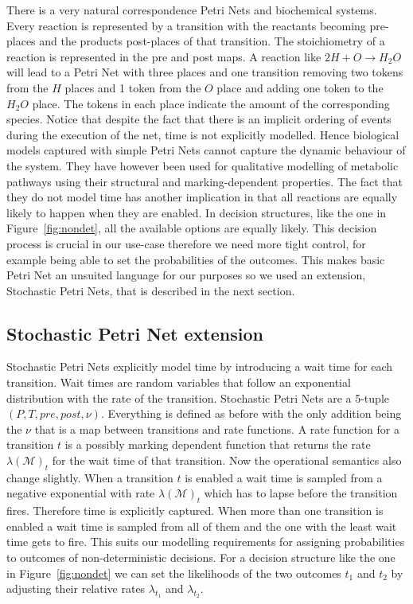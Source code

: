 There is a very natural correspondence Petri Nets and biochemical
systems. Every reaction is represented by a transition with the
reactants becoming pre-places and the products post-places of that
transition. The stoichiometry of a reaction is represented in the
pre and post maps. A reaction like $2H + O \rightarrow H_2O$ will lead
to a Petri Net with three places and one transition removing two
tokens from the $H$ places and 1 token from the $O$ place and adding
one token to the $H_2O$ place. The tokens in each place indicate the
amount of the corresponding species. Notice that despite the
fact that there is an implicit ordering of events during the execution
of the net, time is not explicitly modelled. Hence biological models
captured with simple Petri Nets cannot capture the dynamic behaviour
of the system. They have however been used for qualitative modelling
of metabolic pathways using their structural and
marking-dependent properties. The fact that they do not model time has
another implication in that all reactions are equally likely to
happen when they are enabled. In decision structures, like the one in
Figure~\ref{fig:nondet}, all the available options are equally
likely. This decision process is crucial in our use-case therefore we
need more tight control, for example being able to set the
probabilities of the outcomes. This makes basic Petri Net an unsuited
language for our purposes so we used an extension, Stochastic Petri
Nets, that is described in the next section.

\subsection{Stochastic Petri Net extension}
\label{sec:spn}
Stochastic Petri Nets explicitly model time by introducing a wait time
for each transition. Wait times are random variables that follow an
exponential distribution with the rate of the transition. Stochastic
Petri Nets are a 5-tuple $(P, T, pre, post, \nu)$. Everything is
defined as before with the only addition being the $\nu$ that is a
map between transitions and rate functions. A rate function for a
transition $t$ is a
possibly marking dependent function that returns the rate
$\lambda(\mathcal{M})_t$ for the wait time of that transition. Now the
operational semantics also change slightly. When a transition $t$ is
enabled a wait time is sampled from a negative exponential with rate
$\lambda(\mathcal{M})_t$ which has to lapse before the transition
fires. Therefore time is explicitly captured. When more than one
transition is enabled a wait time is sampled from all of them and the
one with the least wait time gets to fire. This suits our modelling
requirements for assigning probabilities to outcomes of
non-deterministic decisions. For a decision structure like the one in
Figure~\ref{fig:nondet} we can set the likelihoods of the two outcomes
$t_1$ and $t_2$ by adjusting their relative rates $\lambda_{t_1}$ and
$\lambda_{t_2}$. 

